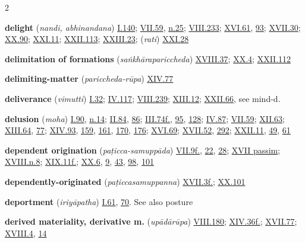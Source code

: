 \begin{multicols}{2}
\begin{vismHanging}
\par\textbf{delight} (\emph{nandi, abhinandana}) \hyperlink{I.140}{I.140}{}; \hyperlink{VII.59}{VII.59}{}, \hyperlink{VII.n25}{n.25}{}; \hyperlink{VIII.233}{VIII.233}{}; \hyperlink{XVI.61}{XVI.61}{}, \hyperlink{XVI.93}{93}{}; \hyperlink{XVII.30}{XVII.30}{}; \hyperlink{XX.90}{XX.90}{}; \hyperlink{XXI.11}{XXI.11}{}; \hyperlink{XXII.113}{XXII.113}{}; \hyperlink{XXIII.23}{XXIII.23}{}; (\emph{rati}) \hyperlink{XXI.28}{XXI.28}{}
\par\textbf{delimitation of formations} (\emph{saṅkhārapariccheda}) \hyperlink{XVIII.37}{XVIII.37}{}; \hyperlink{XX.4}{XX.4}{}; \hyperlink{XXII.112}{XXII.112}{}
\par\textbf{delimiting-matter} (\emph{pariccheda-rūpa}) \hyperlink{XIV.77}{XIV.77}{}
\par\textbf{deliverance} (\emph{vimutti}) \hyperlink{I.32}{I.32}{}; \hyperlink{IV.117}{IV.117}{}; \hyperlink{VIII.239}{VIII.239}{}; \hyperlink{XIII.12}{XIII.12}{}; \hyperlink{XXII.66}{XXII.66}{}, see mind-d. 
\par\textbf{delusion} (\emph{moha}) \hyperlink{I.90}{I.90}{}, \hyperlink{I.n14}{n.14}{}; \hyperlink{II.84}{II.84}{}, \hyperlink{II.86}{86}{}; \hyperlink{III.74}{III.74f.}{}, \hyperlink{III.95}{95}{}, \hyperlink{III.128}{128}{}; \hyperlink{IV.87}{IV.87}{}; \hyperlink{VII.59}{VII.59}{}; \hyperlink{XII.63}{XII.63}{}; \hyperlink{XIII.64}{XIII.64}{}, \hyperlink{XIII.77}{77}{}; \hyperlink{XIV.93}{XIV.93}{}, \hyperlink{XIV.159}{159}{}, \hyperlink{XIV.161}{161}{}, \hyperlink{XIV.170}{170}{}, \hyperlink{XIV.176}{176}{}; \hyperlink{XVI.69}{XVI.69}{}; \hyperlink{XVII.52}{XVII.52}{}, \hyperlink{XVII.292}{292}{}; \hyperlink{XXII.11}{XXII.11}{}, \hyperlink{XXII.49}{49}{}, \hyperlink{XXII.61}{61}{}
\par\textbf{dependent origination} (\emph{paṭicca-samuppāda}) \hyperlink{VII.9}{VII.9f.}{}, \hyperlink{VII.22}{22}{}, \hyperlink{VII.28}{28}{}; \hyperlink{XVII}{XVII passim}{}; \hyperlink{XVIII.n8}{XVIII.n.8}{}; \hyperlink{XIX.11}{XIX.11f.}{}; \hyperlink{XX.6}{XX.6}{}, \hyperlink{XX.9}{9}{}, \hyperlink{XX.43}{43}{}, \hyperlink{XX.98}{98}{}, \hyperlink{XX.101}{101}{}
\par\textbf{dependently-originated} (\emph{paṭiccasamuppanna}) \hyperlink{XVII.3}{XVII.3f.}{}; \hyperlink{XX.101}{XX.101}{}
\par\textbf{deportment} (\emph{iriyāpatha}) \hyperlink{I.61}{I.61}{}, \hyperlink{I.70}{70}{}. See also posture 
\par\textbf{derived materiality, derivative m.} (\emph{upādārūpa}) \hyperlink{VIII.180}{VIII.180}{}; \hyperlink{XIV.36}{XIV.36f.}{}; \hyperlink{XVII.77}{XVII.77}{}; \hyperlink{XVIII.4}{XVIII.4}{}, \hyperlink{XVIII.14}{14}{}

\end{vismHanging}
\end{multicols}
